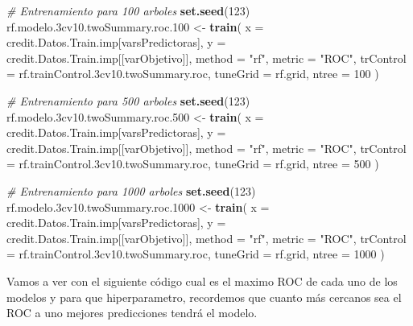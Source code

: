 \documentclass[
]{article}
\newenvironment{Shaded}{\begin{snugshade}}{\end{snugshade}}
\newcommand{\AttributeTok}[1]{\textcolor[rgb]{0.13,0.29,0.53}{#1}}
\newcommand{\CommentTok}[1]{\textcolor[rgb]{0.56,0.35,0.01}{\textit{#1}}}
\newcommand{\DecValTok}[1]{\textcolor[rgb]{0.00,0.00,0.81}{#1}}
\newcommand{\FloatTok}[1]{\textcolor[rgb]{0.00,0.00,0.81}{#1}}
\newcommand{\FunctionTok}[1]{\textcolor[rgb]{0.13,0.29,0.53}{\textbf{#1}}}
\newcommand{\NormalTok}[1]{#1}
\newcommand{\OtherTok}[1]{\textcolor[rgb]{0.56,0.35,0.01}{#1}}
\newcommand{\StringTok}[1]{\textcolor[rgb]{0.31,0.60,0.02}{#1}}
\begin{document}
\begin{Shaded}
\begin{Highlighting}[]
\CommentTok{\# Entrenamiento para 100 arboles}
\FunctionTok{set.seed}\NormalTok{(}\DecValTok{123}\NormalTok{)}
\NormalTok{rf.modelo}\FloatTok{.3}\NormalTok{cv10.twoSummary.roc}\FloatTok{.100} \OtherTok{\textless{}{-}} \FunctionTok{train}\NormalTok{(}
  \AttributeTok{x =}\NormalTok{ credit.Datos.Train.imp[varsPredictoras],}
  \AttributeTok{y =}\NormalTok{ credit.Datos.Train.imp[[varObjetivo]],}
  \AttributeTok{method =} \StringTok{"rf"}\NormalTok{, }
  \AttributeTok{metric =} \StringTok{"ROC"}\NormalTok{,}
  \AttributeTok{trControl =}\NormalTok{ rf.trainControl}\FloatTok{.3}\NormalTok{cv10.twoSummary.roc,}
  \AttributeTok{tuneGrid =}\NormalTok{ rf.grid,}
  \AttributeTok{ntree =} \DecValTok{100}
\NormalTok{)}

\CommentTok{\# Entrenamiento para 500 arboles}
\FunctionTok{set.seed}\NormalTok{(}\DecValTok{123}\NormalTok{)}
\NormalTok{rf.modelo}\FloatTok{.3}\NormalTok{cv10.twoSummary.roc}\FloatTok{.500} \OtherTok{\textless{}{-}} \FunctionTok{train}\NormalTok{(}
  \AttributeTok{x =}\NormalTok{ credit.Datos.Train.imp[varsPredictoras],}
  \AttributeTok{y =}\NormalTok{ credit.Datos.Train.imp[[varObjetivo]],}
  \AttributeTok{method =} \StringTok{"rf"}\NormalTok{, }
  \AttributeTok{metric =} \StringTok{"ROC"}\NormalTok{,}
  \AttributeTok{trControl =}\NormalTok{ rf.trainControl}\FloatTok{.3}\NormalTok{cv10.twoSummary.roc,}
  \AttributeTok{tuneGrid =}\NormalTok{ rf.grid,}
  \AttributeTok{ntree =} \DecValTok{500}
\NormalTok{)}

\CommentTok{\# Entrenamiento para 1000 arboles}
\FunctionTok{set.seed}\NormalTok{(}\DecValTok{123}\NormalTok{)}
\NormalTok{rf.modelo}\FloatTok{.3}\NormalTok{cv10.twoSummary.roc}\FloatTok{.1000} \OtherTok{\textless{}{-}} \FunctionTok{train}\NormalTok{(}
  \AttributeTok{x =}\NormalTok{ credit.Datos.Train.imp[varsPredictoras],}
  \AttributeTok{y =}\NormalTok{ credit.Datos.Train.imp[[varObjetivo]],}
  \AttributeTok{method =} \StringTok{"rf"}\NormalTok{, }
  \AttributeTok{metric =} \StringTok{"ROC"}\NormalTok{,}
  \AttributeTok{trControl =}\NormalTok{ rf.trainControl}\FloatTok{.3}\NormalTok{cv10.twoSummary.roc,}
  \AttributeTok{tuneGrid =}\NormalTok{ rf.grid,}
  \AttributeTok{ntree =} \DecValTok{1000}
\NormalTok{)}
\end{Highlighting}
\end{Shaded}

Vamos a ver con el siguiente código cual es el maximo ROC de cada uno de
los modelos y para que hiperparametro, recordemos que cuanto más
cercanos sea el ROC a uno mejores predicciones tendrá el modelo.
\end{document}
